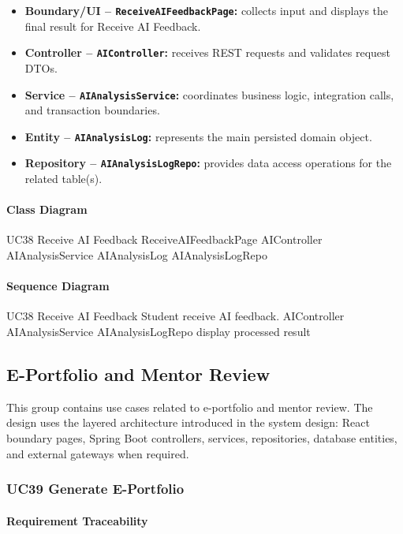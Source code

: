 \begin{itemize}
    \item \textbf{Boundary/UI -- \texttt{ReceiveAIFeedbackPage}:} collects input and displays the final result for Receive AI Feedback.
    \item \textbf{Controller -- \texttt{AIController}:} receives REST requests and validates request DTOs.
    \item \textbf{Service -- \texttt{AIAnalysisService}:} coordinates business logic, integration calls, and transaction boundaries.
    \item \textbf{Entity -- \texttt{AIAnalysisLog}:} represents the main persisted domain object.
    \item \textbf{Repository -- \texttt{AIAnalysisLogRepo}:} provides data access operations for the related table(s).
\end{itemize}

\paragraph{Class Diagram}

\ClassDiagram
{UC38 Receive AI Feedback}
{ReceiveAIFeedbackPage}
{AIController}
{AIAnalysisService}
{AIAnalysisLog}
{AIAnalysisLogRepo}

\paragraph{Sequence Diagram}

\SequenceDiagram
{UC38 Receive AI Feedback}
{Student}
{receive AI feedback.}
{AIController}
{AIAnalysisService}
{AIAnalysisLogRepo}
{display processed result}

\subsection{E-Portfolio and Mentor Review}

This group contains use cases related to e-portfolio and mentor review. The design uses the layered architecture introduced in the system design: React boundary pages, Spring Boot controllers, services, repositories, database entities, and external gateways when required.

\subsubsection{UC39 Generate E-Portfolio}

\paragraph{Requirement Traceability}

